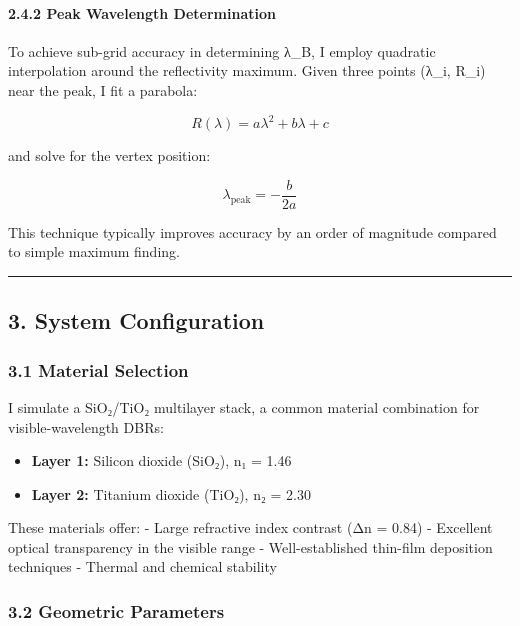 \documentclass[
]{article}
\providecommand{\tightlist}{%
  \setlength{\itemsep}{0pt}\setlength{\parskip}{0pt}}
\begin{document}
\paragraph{2.4.2 Peak Wavelength
Determination}\label{peak-wavelength-determination}

To achieve sub-grid accuracy in determining λ\_B, I employ quadratic
interpolation around the reflectivity maximum. Given three points (λ\_i,
R\_i) near the peak, I fit a parabola:

\[R(\lambda) = a\lambda^2 + b\lambda + c\]

and solve for the vertex position:

\[\lambda_{\text{peak}} = -\frac{b}{2a}\]

This technique typically improves accuracy by an order of magnitude
compared to simple maximum finding.

\begin{center}\rule{0.5\linewidth}{0.5pt}\end{center}

\subsection{3. System Configuration}\label{system-configuration}

\subsubsection{3.1 Material Selection}\label{material-selection}

I simulate a SiO₂/TiO₂ multilayer stack, a common material combination
for visible-wavelength DBRs:

\begin{itemize}
\tightlist
\item
  \textbf{Layer 1:} Silicon dioxide (SiO₂), n₁ = 1.46
\item
  \textbf{Layer 2:} Titanium dioxide (TiO₂), n₂ = 2.30
\end{itemize}

These materials offer: - Large refractive index contrast (Δn = 0.84) -
Excellent optical transparency in the visible range - Well-established
thin-film deposition techniques - Thermal and chemical stability

\subsubsection{3.2 Geometric Parameters}\label{geometric-parameters}
\end{document}

